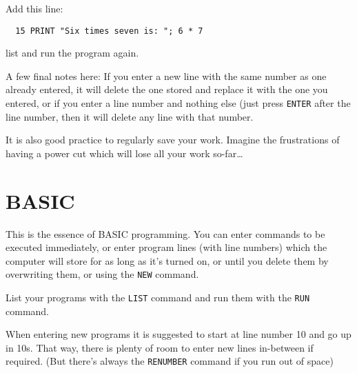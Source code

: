 \noindent
Add this line:
\begin{verbatim}
  15 PRINT "Six times seven is: "; 6 * 7
\end{verbatim}
list and run the program again. 

A few final notes here: If you enter a new line with the same number as
one already entered, it will delete the one stored and replace it with
the one you entered, or if you enter a line number and nothing else
(just press {\tt ENTER} after the line number, then it will delete any
line with that number.

It \meek is also good practice to regularly save your work.  Imagine the
frustrations of having a power cut which will lose all your work
so-far\dots

\section{BASIC}
This is the essence of BASIC programming. You can enter commands to
be executed immediately, or enter program lines (with line numbers)
which the computer will store for as long as it's turned on, or until
you delete them by overwriting them, or using the {\tt NEW} command.

List your programs with the {\tt LIST} command and run them with the
{\tt RUN} command.

When entering new programs it is suggested to start at line number 10
and go up in 10s. That way, there is plenty of room to enter new lines
in-between if required. (But there's always the {\tt RENUMBER}
 command if you run out of space)\\
